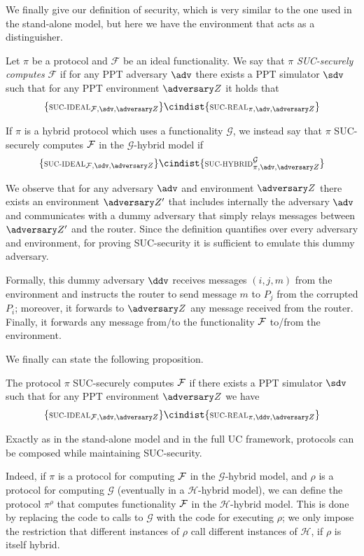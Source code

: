 We finally give our definition of security, which is very similar to the one used in the stand-alone model, but here we have the environment that acts as a distinguisher.

\begin{definition}
    Let $\pi$ be a protocol and $\mathcal F$ be an ideal functionality. We say that $\pi$ \emph{SUC-securely computes} $\mathcal F$ if for any PPT adversary $\adv$ there exists a PPT simulator $\sdv$ such that for any PPT environment $\zdv$ it holds that
    $$ \{ \textsc{\scriptsize SUC-IDEAL}_{\Fun, \sdv, \zdv} \} \cindist \{ \textsc{\scriptsize SUC-REAL}_{\pi, \adv, \zdv} \}$$
    
    If $\pi$ is a hybrid protocol which uses a functionality $\mathcal G$, we instead say that $\pi$ SUC-securely computes $\mathcal{F}$ in the $\mathcal G$-hybrid model if
    $$ \{ \textsc{\scriptsize SUC-IDEAL}_{\Fun, \sdv, \zdv} \} \cindist \{ \textsc{\scriptsize SUC-HYBRID}^{\mathcal G}_{\pi, \adv, \zdv} \}$$
\end{definition}

We observe that for any adversary $\adv$ and environment $\zdv$ there exists an environment $\zdv'$ that includes internally the adversary $\adv$ and communicates with a dummy adversary that simply relays messages between $\zdv'$ and the router. Since the definition quantifies over every adversary and environment, for proving SUC-security it is sufficient to emulate this dummy adversary.

Formally, this dummy adversary $\ddv$ receives messages $(i,j,m)$ from the environment and instructs the router to send message $m$ to $P_j$ from the corrupted $P_i$; moreover, it forwards to $\zdv$ any message received from the router. Finally, it forwards any message from/to the functionality $\mathcal{F}$ to/from the environment.

We finally can state the following proposition.
\begin{proposition}
    The protocol $\pi$ SUC-securely computes $\mathcal{F}$ if there exists a PPT simulator $\sdv$ such that for any PPT environment $\zdv$ we have 
    $$ \{ \textsc{\scriptsize SUC-IDEAL}_{\Fun, \sdv, \zdv} \} \cindist \{ \textsc{\scriptsize SUC-REAL}_{\pi, \ddv, \zdv} \}$$
\end{proposition}

Exactly as in the stand-alone model and in the full UC framework, protocols can be composed while maintaining SUC-security.

Indeed, if $\pi$ is a protocol for computing $\mathcal{F}$ in the $\mathcal G$-hybrid model, and $\rho$ is a protocol for computing $\mathcal G$ (eventually in a $\mathcal H$-hybrid model), we can define the protocol $\pi^\rho$ that computes functionality $\mathcal{F}$ in the $\mathcal H$-hybrid model. This is done by replacing the code to calls to $\mathcal G$ with the code for executing $\rho$; we only impose the restriction that different instances of $\rho$ call different instances of $\mathcal H$, if $\rho$ is itself hybrid.

